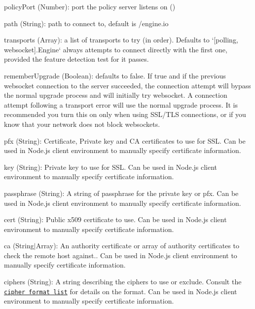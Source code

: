 \begin{DoxyItemize}
\begin{DoxyItemize}
\begin{DoxyItemize}
\item {\ttfamily policy\+Port} ({\ttfamily Number})\+: port the policy server listens on ({})
\item {\ttfamily path} ({\ttfamily String})\+: path to connect to, default is {\ttfamily /engine.io}
\item {\ttfamily transports} ({\ttfamily Array})\+: a list of transports to try (in order). Defaults to `\mbox{[}\textquotesingle{}polling\textquotesingle{}, \textquotesingle{}websocket\textquotesingle{}\mbox{]}{\ttfamily .}Engine` always attempts to connect directly with the first one, provided the feature detection test for it passes.
\item {\ttfamily remember\+Upgrade} ({\ttfamily Boolean})\+: defaults to false. If true and if the previous websocket connection to the server succeeded, the connection attempt will bypass the normal upgrade process and will initially try websocket. A connection attempt following a transport error will use the normal upgrade process. It is recommended you turn this on only when using S\+S\+L/\+T\+LS connections, or if you know that your network does not block websockets.
\item {\ttfamily pfx} ({\ttfamily String})\+: Certificate, Private key and CA certificates to use for S\+SL. Can be used in Node.\+js client environment to manually specify certificate information.
\item {\ttfamily key} ({\ttfamily String})\+: Private key to use for S\+SL. Can be used in Node.\+js client environment to manually specify certificate information.
\item {\ttfamily passphrase} ({\ttfamily String})\+: A string of passphrase for the private key or pfx. Can be used in Node.\+js client environment to manually specify certificate information.
\item {\ttfamily cert} ({\ttfamily String})\+: Public x509 certificate to use. Can be used in Node.\+js client environment to manually specify certificate information.
\item {\ttfamily ca} ({\ttfamily String}$\vert${\ttfamily Array})\+: An authority certificate or array of authority certificates to check the remote host against.. Can be used in Node.\+js client environment to manually specify certificate information.
\item {\ttfamily ciphers} ({\ttfamily String})\+: A string describing the ciphers to use or exclude. Consult the \href{http://www.openssl.org/docs/apps/ciphers.html#CIPHER_LIST_FORMAT}{\tt cipher format list} for details on the format. Can be used in Node.\+js client environment to manually specify certificate information.

\end{DoxyItemize}
\end{DoxyItemize}
\end{DoxyItemize}
